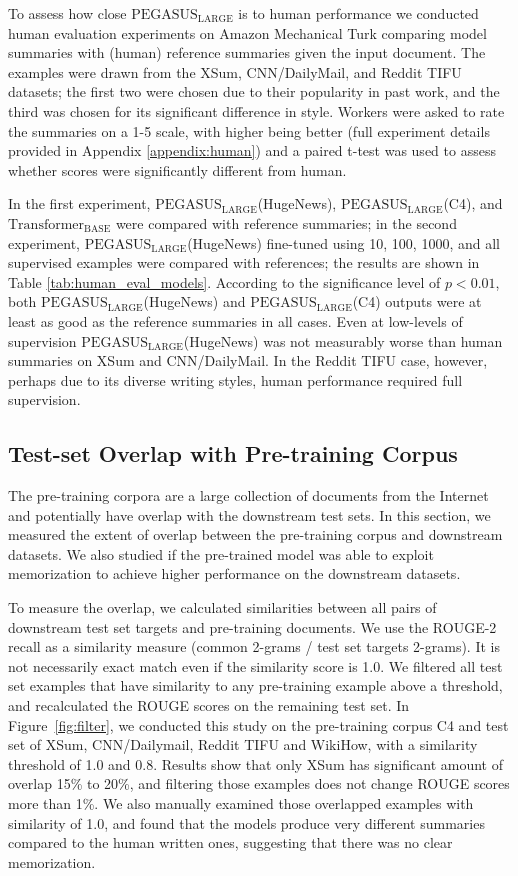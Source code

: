 \documentclass{article}
\newcommand\transformerbase{$\text{Transformer}_{\text{BASE}}$\xspace}
\newcommand\pegasuslarge{$\text{PEGASUS}_{\text{LARGE}}$\xspace}
\newcommand\gnews{HugeNews\xspace}
\begin{document}
To assess how close \pegasuslarge is to human performance we conducted human evaluation experiments 
on Amazon Mechanical Turk
comparing model summaries with (human) reference summaries given the input document. The examples were drawn from the XSum, CNN/DailyMail, and Reddit TIFU datasets; the first two were chosen due to their popularity in past work, and the third was chosen for its significant difference in style.
Workers were asked to rate the summaries on a 1-5 scale, with higher
being better (full experiment details provided in Appendix \ref{appendix:human})
and a paired t-test was used to assess whether scores were significantly different from human. 

In the first experiment,
\pegasuslarge(\gnews), \pegasuslarge(C4), and \transformerbase were
compared with reference summaries; in the second experiment,
\pegasuslarge(\gnews) fine-tuned using 10, 100, 1000, and all 
supervised examples were compared with references; the results are shown in Table \ref{tab:human_eval_models}.
According to the significance level of $p<0.01$, both \pegasuslarge(\gnews) and \pegasuslarge(C4) outputs were at least as good as the reference summaries in all cases.
Even at low-levels of supervision \pegasuslarge(\gnews) was not measurably worse than human summaries on XSum and CNN/DailyMail. 
In the Reddit TIFU case, however, perhaps due to its diverse writing styles,
human performance required full supervision.

\subsection{Test-set Overlap with Pre-training Corpus}

The pre-training corpora are a large collection of documents from the Internet and potentially have overlap with the downstream test sets. In this section, we measured the extent of overlap between the pre-training corpus and downstream datasets. We also studied if the pre-trained model was able to exploit memorization to achieve higher performance on the downstream datasets.

To measure the overlap, we calculated similarities between all pairs of downstream test set targets and pre-training documents. We use the ROUGE-2 recall as a similarity measure (common 2-grams / test set targets 2-grams). It is not necessarily exact match even if the similarity score is 1.0. We filtered all test set examples that have similarity to any pre-training example above a threshold, and recalculated the ROUGE scores on the remaining test set. In Figure~\ref{fig:filter}, we conducted this study on the pre-training corpus C4 and test set of XSum, CNN/Dailymail, Reddit TIFU and WikiHow, with a similarity threshold of 1.0 and 0.8. Results show that only XSum has significant amount of overlap 15\% to 20\%, and filtering those examples does not change ROUGE scores more than 1\%.
We also manually examined those overlapped examples with similarity of 1.0, and found that the models produce very different summaries compared to the human written ones, suggesting that there was no clear memorization.
\end{document}
